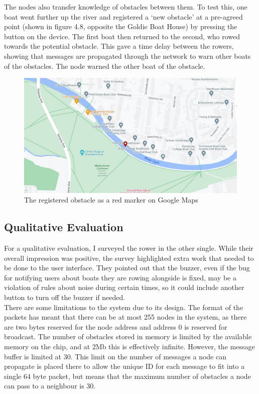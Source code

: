 \documentclass[12pt,a4paper]{report}
\begin{document}
The nodes also transfer knowledge of obstacles between them. To test this, one boat went further up the river and registered a `new obstacle' at a pre-agreed point (shown in figure 4.8, opposite the Goldie Boat House) by pressing the button on the device. The first boat then returned to the second, who rowed towards the potential obstacle. This gave a time delay between the rowers, showing that messages are propagated through the network to warn other boats of the obstacles. The node warned the other boat of the obstacle. 
\begin{figure}[h]
\begin{center}
\includegraphics[scale=0.3]{obstacle.jpg}
\end{center}
\caption{The registered obstacle as a red marker on Google Maps \cite{googlemapsgeneral}}
\end{figure}


\subsection{Qualitative Evaluation}
For a qualitative evaluation, I surveyed the rower in the other single. While their overall impression was positive, the survey highlighted extra work that needed to be done to the user interface. They pointed out that the buzzer, even if the bug for notifying users about boats they are rowing alongside is fixed, may be a violation of rules about noise during certain times, so it could include another button to turn off the buzzer if needed. \\
There are some limitations to the system due to its design. The format of the packets has meant that there can be at most 255 nodes in the system, as there are two bytes reserved for the node address and address 0 is reserved for broadcast. The number of obstacles stored in memory is limited by the available memory on the chip, and at 2Mb this is effectively infinite. However, the message buffer is limited at 30. This limit on the number of messages a node can propagate is placed there to allow the unique ID for each message to fit into a single 64 byte packet, but means that the maximum number of obstacles a node can pass to a neighbour is 30.
\end{document}
